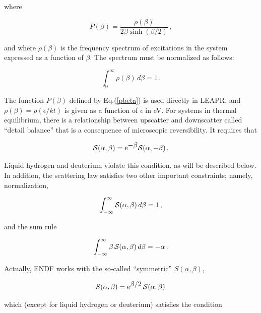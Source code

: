 \noindent
where

\noindent
\begin{equation}
   P(\beta)=\frac{\rho(\beta)}{2\beta\sinh(\beta/2)}\,,
   \label{pbeta}
\end{equation}

\noindent
and where $\rho(\beta)$ is the frequency spectrum
of excitations in the system expressed as a function of $\beta$.  The
spectrum must be normalized as
follows:

\begin{equation}
   \int_0^\infty \rho(\beta)\,d\beta=1\,.
   \label{rnorm}
\end{equation}

\noindent
The function $P(\beta)$ defined by Eq.(\ref{pbeta}) is used directly in
LEAPR, and $\rho(\beta)=\rho(\epsilon/kt)$ is given as a function of
$\epsilon$ in eV.  For systems in thermal equilibrium, there is a
relationship  between upscatter and downscatter called ``detail balance''
 that is a consequence of microscopic reversibility.
 It requires that

\begin{equation}
  {\cal S}(\alpha,\beta)={\rm e}^{\textstyle -\beta}{\cal S}(\alpha,-\beta)\,.
\end{equation}

\noindent
Liquid hydrogen and deuterium violate this
condition, as will be described below.  In addition, the scattering
law satisfies two other important constraints; namely, normalization,

\begin{equation}
   \int_{-\infty}^\infty {\cal S}(\alpha,\beta)\,d\beta=1\,,
   \label{ssnorm}
\end{equation}

\noindent
and the sum rule

\begin{equation}
   \int_{-\infty}^\infty \beta\,{\cal S}(\alpha,\beta)\,d\beta=-\alpha\,.
   \label{sssum}
\end{equation}

\noindent
Actually, ENDF works with the so-called ``symmetric'' $S(\alpha,\beta)$,

\begin{equation}
   S(\alpha,\beta)={\rm e}^{\textstyle \beta/2}\,{\cal S}(\alpha,\beta)\,
\end{equation}

\noindent
which (except for liquid hydrogen or deuterium) satisfies the condition

